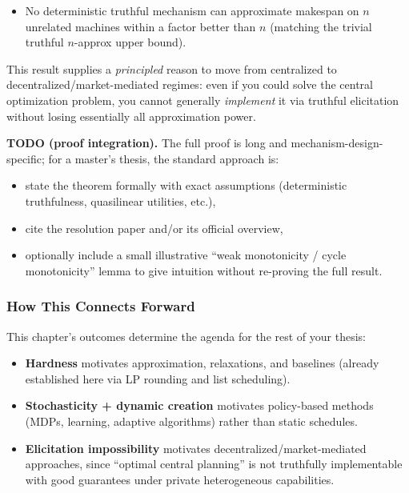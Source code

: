 \begin{itemize}
\item No deterministic truthful mechanism can approximate makespan on \(n\) unrelated machines within a factor better than \(n\) (matching the trivial truthful \(n\)-approx upper bound).
\end{itemize}

This result supplies a \emph{principled} reason to move from centralized to decentralized/market-mediated regimes: even if you could solve the central optimization problem, you cannot generally \emph{implement} it via truthful elicitation without losing essentially all approximation power.

\textbf{TODO (proof integration).} The full proof is long and mechanism-design-specific; for a master's thesis, the standard approach is:

\begin{itemize}
\item state the theorem formally with exact assumptions (deterministic truthfulness, quasilinear utilities, etc.),
\item cite the resolution paper and/or its official overview,
\item optionally include a small illustrative ``weak monotonicity / cycle monotonicity'' lemma to give intuition without re-proving the full result.
\end{itemize}

\subsubsection{How This Connects Forward}

This chapter's outcomes determine the agenda for the rest of your thesis:

\begin{itemize}
\item \textbf{Hardness} motivates approximation, relaxations, and baselines (already established here via LP rounding and list scheduling).
\item \textbf{Stochasticity + dynamic creation} motivates policy-based methods (MDPs, learning, adaptive algorithms) rather than static schedules.
\item \textbf{Elicitation impossibility} motivates decentralized/market-mediated approaches, since ``optimal central planning'' is not truthfully implementable with good guarantees under private heterogeneous capabilities.
\end{itemize}

